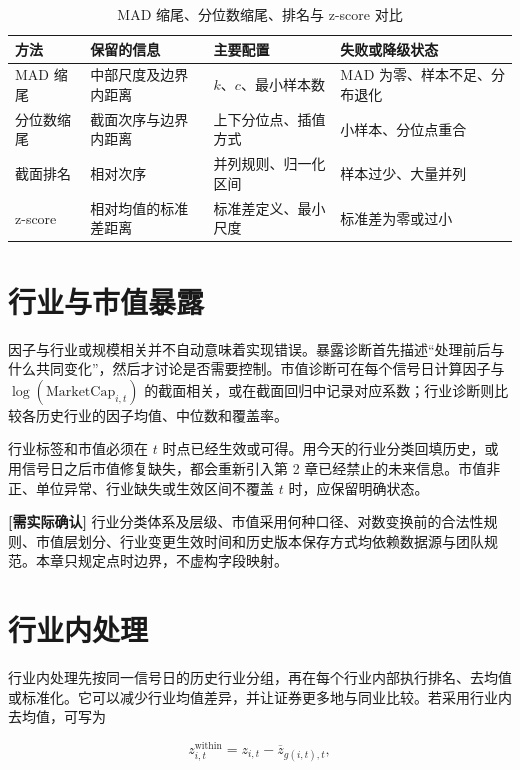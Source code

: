 \begin{table}[htbp]
  \centering
  \small
  \caption{MAD 缩尾、分位数缩尾、排名与 z-score 对比}
  \label{tab:ch05-method-comparison}
  \begin{tabularx}{\textwidth}{p{2.5cm} Y Y Y}
    \toprule
    方法 & 保留的信息 & 主要配置 & 失败或降级状态 \\
    \midrule
    MAD 缩尾 & 中部尺度及边界内距离 & \(k\)、\(c\)、最小样本数 & MAD 为零、样本不足、分布退化 \\
    分位数缩尾 & 截面次序与边界内距离 & 上下分位点、插值方式 & 小样本、分位点重合 \\
    截面排名 & 相对次序 & 并列规则、归一化区间 & 样本过少、大量并列 \\
    z-score & 相对均值的标准差距离 & 标准差定义、最小尺度 & 标准差为零或过小 \\
    \bottomrule
  \end{tabularx}
\end{table}

\section{行业与市值暴露}

因子与行业或规模相关并不自动意味着实现错误。暴露诊断首先描述“处理前后与什么共同变化”，然后才讨论是否需要控制。市值诊断可在每个信号日计算因子与
\(\log(\mathrm{MarketCap}_{i,t})\) 的截面相关，或在截面回归中记录对应系数；行业诊断则比较各历史行业的因子均值、中位数和覆盖率。

行业标签和市值必须在 \(t\) 时点已经生效或可得。用今天的行业分类回填历史，或用信号日之后市值修复缺失，都会重新引入第 2 章已经禁止的未来信息。市值非正、单位异常、行业缺失或生效区间不覆盖 \(t\) 时，应保留明确状态。

\begin{confirmbox}
\textbf{[需实际确认]} 行业分类体系及层级、市值采用何种口径、对数变换前的合法性规则、市值层划分、行业变更生效时间和历史版本保存方式均依赖数据源与团队规范。本章只规定点时边界，不虚构字段映射。
\end{confirmbox}

\section{行业内处理}

行业内处理先按同一信号日的历史行业分组，再在每个行业内部执行排名、去均值或标准化。它可以减少行业均值差异，并让证券更多地与同业比较。若采用行业内去均值，可写为

\begin{equation}
  z^{\mathrm{within}}_{i,t}
  =
  z_{i,t}
  -
  \overline{z}_{g(i,t),t},
  \label{eq:ch05-within-industry}
\end{equation}

